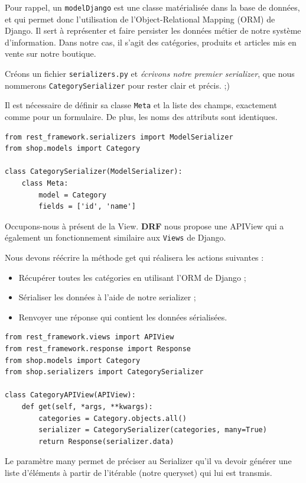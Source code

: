 \documentclass[a4paper]{article}
\begin{document}
\begin{theorem}
Pour rappel, un {\tt modelDjango} est une classe matérialisée dans la base de données, et qui permet donc l’utilisation de l’Object-Relational Mapping ({\color{monOrange}ORM}) de Django. Il sert à représenter et faire persister les données métier de notre système d’information. Dans notre cas, il s’agit des catégories, produits et articles mis en vente sur notre boutique.
\end{theorem}
Créons un fichier  {\tt serializers.py}  et {\em écrivons notre premier {\color{monOrange}serializer}}, que nous nommerons  {\tt CategorySerializer}  pour rester clair et précis. ;)

Il est nécessaire de définir sa classe  {\tt Meta}  et la liste des champs, exactement comme pour un formulaire. De plus, les noms des attributs sont identiques.
\begin{verbatim}
from rest_framework.serializers import ModelSerializer
from shop.models import Category
 
class CategorySerializer(ModelSerializer):
    class Meta:
        model = Category
        fields = ['id', 'name']

\end{verbatim}
Occupons-nous à présent de la {\color{monOrange}View}. {\bf DRF} nous propose une  {\color{monOrange}APIView}  qui a également un fonctionnement similaire aux  {\tt Views}  de Django.

Nous devons réécrire la méthode  {\color{monOrange}get}  qui réalisera les actions suivantes :
\begin{itemize}
\item Récupérer toutes les catégories en utilisant l’ORM de Django ;
\item Sérialiser les données à l’aide de notre serializer ;
\item Renvoyer une réponse qui contient les données sérialisées.
\end{itemize}
\begin{verbatim}
from rest_framework.views import APIView
from rest_framework.response import Response
from shop.models import Category
from shop.serializers import CategorySerializer
 
class CategoryAPIView(APIView):
    def get(self, *args, **kwargs):
        categories = Category.objects.all()
        serializer = CategorySerializer(categories, many=True)
        return Response(serializer.data)
\end{verbatim}
Le paramètre  {\color{monOrange}many}  permet de préciser au {\color{monOrange}Serializer} qu’il va devoir générer une liste d’éléments à partir de l’itérable (notre {\color{monOrange}queryset}) qui lui est transmis.
\end{document}
